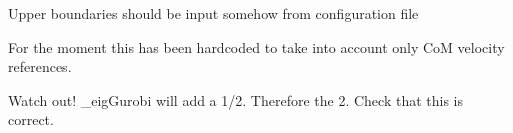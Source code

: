 
\begin{DoxyRefList}
\item[\label{todo__todo000003}%
\hypertarget{todo__todo000003}{}%
\-Member \hyperlink{classConstancy_ae38922343ad8a98bd4e501e8ada5c83c}{\-Constancy\-:\-:\-Constancy} ()]\-Upper boundaries should be input somehow from configuration file  
\item[\label{todo__todo000008}%
\hypertarget{todo__todo000008}{}%
\-Member \hyperlink{classMIQPController_ada92fc35065a11b889019f2948c1888d}{\-M\-I\-Q\-P\-Controller\-:\-:\-\_\-\-Sw} ]\-For the moment this has been hardcoded to take into account only \-Co\-M velocity references.  
\item[\label{todo__todo000007}%
\hypertarget{todo__todo000007}{}%
\-Member \hyperlink{classMIQPController_aa8fd8452a14d8e7731bf45044e1c7a59}{\-M\-I\-Q\-P\-Controller\-:\-:run} ()]\-Watch out! \-\_\-eig\-Gurobi will add a 1/2. \-Therefore the 2. \-Check that this is correct. 


\end{DoxyRefList}
